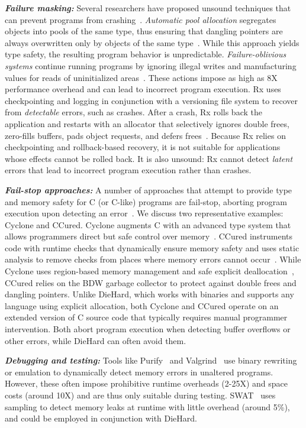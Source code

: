 \documentclass{sig-alternate}
\begin{document}
{\bf \em Failure masking:} Several researchers have proposed unsound
techniques that can prevent programs from
crashing~\cite{dhur03,rx,failure-oblivious}. {\em Automatic pool
allocation} segregates objects into pools of the same type, thus
ensuring that dangling pointers are always overwritten only by objects
of the same type~\cite{dhur03}. While this approach yields type
safety, the resulting program behavior is unpredictable. {\em
Failure-oblivious systems} continue running programs by
ignoring illegal writes and manufacturing values for reads of
uninitialized areas~\cite{failure-oblivious}. These actions impose as
high as 8X performance overhead and can lead to incorrect program
execution. Rx uses checkpointing and logging in conjunction with a
versioning file system to recover from \emph{detectable} errors,
such as crashes. After a crash, Rx rolls back the application and
restarts with an allocator that selectively ignores double frees,
zero-fills buffers, pads object requests, and defers
frees~\cite{rx}. Because Rx relies on checkpointing and rollback-based
recovery, it is not suitable for applications whose effects cannot be
rolled back. It is also unsound: Rx cannot detect \emph{latent}
errors that lead to incorrect program execution rather than crashes.

{\bf \em Fail-stop approaches:} A number of approaches that attempt to
provide type and memory safety for C (or C-like) programs are
fail-stop, aborting program execution upon detecting an
error~\cite{178446,1062520,503286,1029913,940113}. We discuss two
representative examples: Cyclone and CCured. Cyclone augments C with
an advanced type system that allows programmers direct but safe
control over memory~\cite{713871}. CCured instruments code with
runtime checks that dynamically ensure memory safety and uses static
analysis to remove checks from places where memory errors cannot
occur~\cite{503286}. While Cyclone uses region-based memory management
and safe explicit
deallocation~\cite{512563,swamy05experience}, CCured relies on the BDW
garbage collector to protect against double frees and dangling
pointers. Unlike DieHard, which works with binaries and supports any
language using explicit allocation, both Cyclone and CCured operate on
an extended version of C source code that typically requires manual
programmer intervention. Both abort program execution when detecting
buffer overflows or other errors, while DieHard can often avoid them.

{\bf \em Debugging and testing:} Tools like Purify~\cite{Hastings:91} and
Valgrind~\cite{Net:bounds-checking2004} use binary
rewriting or emulation to dynamically detect memory errors in
unaltered programs. However, these often impose prohibitive runtime
overheads (2-25X) and space costs (around 10X) and are thus only
suitable during testing. SWAT~\cite{1024412} uses sampling to detect memory
leaks at runtime with little overhead (around 5\%), and could be
employed in conjunction with DieHard.
\end{document}
